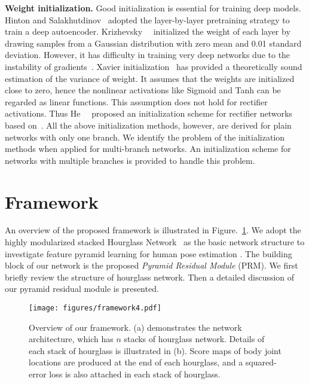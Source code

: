 \documentclass[10pt,twocolumn,letterpaper]{article}
\newcommand{\smalltitle}[1]{\vspace{0.2em}\noindent \textbf{{#1}}}
\begin{document}
\smalltitle{Weight initialization. }
Good initialization is essential for training deep models. 
Hinton and Salakhutdinov~\cite{hinton2006reducing} adopted the layer-by-layer pretraining strategy to train a deep autoencoder. 
Krizhevsky~\etal~\cite{krizhevsky2012imagenet} initialized the weight of each layer by drawing samples from a Gaussian distribution with zero mean and 0.01 standard deviation. 
However, it has difficulty in training very deep networks due to the instability of gradients~\cite{simonyan2014very}. 
Xavier initialization~\cite{glorot2010understanding} has provided a theoretically sound estimation of the variance of weight. 
It assumes that the weights are initialized close to zero, hence the nonlinear activations like Sigmoid and Tanh can be regarded as linear functions. 
This assumption does not hold for rectifier~\cite{nair2010rectified} activations. 
Thus He~\etal~\cite{he2015delving} proposed an initialization scheme for rectifier networks based on~\cite{glorot2010understanding}. 
All the above initialization methods, however, are derived for plain networks with only one branch. We identify the problem of the initialization methods when applied for multi-branch networks. 
An initialization scheme for networks with multiple branches is provided to handle this problem. 



\section{Framework}


An overview of the proposed framework is illustrated in Figure.~\ref{fig:framework}. 
We adopt the highly modularized stacked Hourglass Network~\cite{newell2016stacked} as the basic network structure to investigate feature pyramid learning for human pose estimation . 
The building block of our network is the proposed \textit{Pyramid Residual Module} (PRM). 
We first briefly review the structure of hourglass network. 
Then a detailed discussion of our pyramid residual module is presented.


\begin{figure}\begin{center}
		\texttt{[image: figures/framework4.pdf]}
	\end{center}
	\vspace{-0.5em}
	\caption{Overview of our framework. (a) demonstrates the network architecture, which has $n$ stacks of hourglass network. Details of each stack of hourglass is illustrated in (b). 
		Score maps of body joint locations are produced at the end of each hourglass, and a squared-error loss is also attached in each stack of hourglass.}
	\label{fig:framework}
	\vspace{-1em}
\end{figure}
\end{document}

